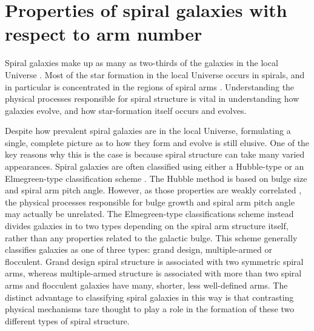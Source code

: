 \documentclass[useAMS,usenatbib]{mn2e}
\begin{document}
\section{Properties of spiral galaxies with respect to arm number}
\label{sec:results}

Spiral galaxies make up as many as two-thirds of the galaxies in the local Universe \citep{Lintott_11,Willett_13}. Most of the star formation in the local Universe occurs in spirals, and in particular is concentrated in the regions of spiral arms \citep{Grosbol_12,Dobbs_14}. Understanding the physical processes responsible for spiral structure is vital in understanding how galaxies evolve, and how star-formation itself occurs and evolves.

Despite how prevalent  spiral galaxies are in the local Universe, formulating a single, complete picture as to how they form and evolve is still elusive. One of the key reasons why this is the case is because spiral structure can take many varied appearances. Spiral galaxies are often classified using either a Hubble-type \citep{Hubble_26} or an Elmegreen-type classification scheme \citep{EE_82,EE_87}. The Hubble method is based on bulge size and spiral arm pitch angle. However, as those properties are weakly correlated \citep{Kennicutt_81,Seigar_98}, the physical processes responsible for bulge growth and spiral arm pitch angle may actually be unrelated. The Elmegreen-type classifications scheme instead divides galaxies in to two types depending on the spiral arm structure itself, rather than any properties related to the galactic bulge. This scheme generally classifies galaxies as one of three types: grand design, multiple-armed or flocculent. Grand design spiral structure is associated with two symmetric spiral arms, whereas multiple-armed structure is associated with more than two spiral arms and flocculent galaxies have many, shorter, less well-defined arms. The distinct advantage to classifying spiral galaxies in this way is that contrasting physical mechanisms tare thought to play a role in the formation of these two different types of spiral structure.
\end{document}

